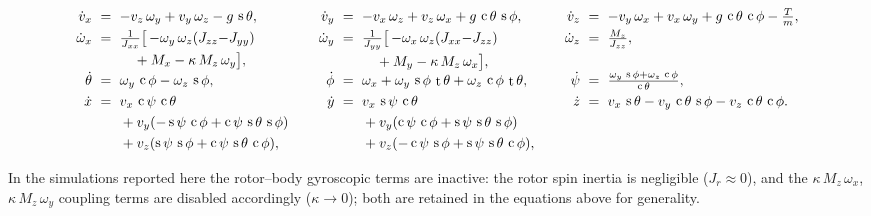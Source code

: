 \documentclass[conf]{new-aiaa}
\DeclareMathOperator{\s}{s}
\DeclareMathOperator{\cs}{c}
\DeclareMathOperator{\tn}{t}
\begin{document}
\small
\begin{equation}
\label{eq:nonlinear-eom}
\setlength{\arraycolsep}{3pt}
\begin{array}{rclcrclcrcl}
\dot v_x &=& -v_z\,\omega_y + v_y\,\omega_z - g\,\s\theta, &\quad&
\dot v_y &=& -v_x\,\omega_z + v_z\,\omega_x + g\,\cs\theta\,\s\phi, &\quad&
\dot v_z &=& -v_y\,\omega_x + v_x\,\omega_y + g\,\cs\theta\,\cs\phi - \tfrac{T}{m}, \\[3pt]
\dot\omega_x &=& \begin{aligned}[t]
&\tfrac{1}{J_{xx}}\bigl[\,{-}\omega_y\,\omega_z(J_{zz}{-}J_{yy}) \\
&\quad + M_x - \kappa\,M_z\,\omega_y\bigr],
\end{aligned} &&
\dot\omega_y &=& \begin{aligned}[t]
&\tfrac{1}{J_{yy}}\bigl[\,{-}\omega_x\,\omega_z(J_{xx}{-}J_{zz}) \\
&\quad + M_y - \kappa\,M_z\,\omega_x\bigr],
\end{aligned} &&
\dot\omega_z &=& \tfrac{M_z}{J_{zz}}, \\[3pt]
\dot\theta &=& \omega_y\,\cs\phi - \omega_z\,\s\phi, &&
\dot\phi &=& \omega_x + \omega_y\,\s\phi\,\tn\theta + \omega_z\,\cs\phi\,\tn\theta, &&
\dot\psi &=& \tfrac{\omega_y\,\s\phi + \omega_z\,\cs\phi}{\cs\theta}, \\[3pt]
\dot x &=& \begin{aligned}[t]
&v_x\,\cs\psi\,\cs\theta \\
&+ v_y(-\s\psi\,\cs\phi + \cs\psi\,\s\theta\,\s\phi) \\
&+ v_z(\s\psi\,\s\phi + \cs\psi\,\s\theta\,\cs\phi),
\end{aligned} &&
\dot y &=& \begin{aligned}[t]
&v_x\,\s\psi\,\cs\theta \\
&+ v_y(\cs\psi\,\cs\phi + \s\psi\,\s\theta\,\s\phi) \\
&+ v_z(-\cs\psi\,\s\phi + \s\psi\,\s\theta\,\cs\phi),
\end{aligned} &&
\dot z &=& v_x\,\s\theta - v_y\,\cs\theta\,\s\phi - v_z\,\cs\theta\,\cs\phi.
\end{array}
\end{equation}
\normalsize

In the simulations reported here the rotor--body gyroscopic terms are inactive: the rotor spin inertia is negligible ($J_r \approx 0$), and the $\kappa\,M_z\,\omega_x$, $\kappa\,M_z\,\omega_y$ coupling terms are disabled accordingly ($\kappa \to 0$); both are retained in the equations above for generality.
\end{document}
